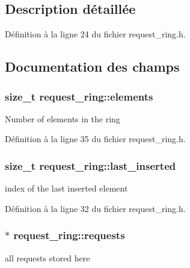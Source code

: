 \subsection{Description détaillée}


Définition à la ligne 24 du fichier request\+\_\+ring.\+h.



\subsection{Documentation des champs}
\hypertarget{structrequest__ring_a32380ec7244da66681fd9c320abf4686}{
\subsubsection[{elements}]{\setlength{\rightskip}{0pt plus 5cm}size\+\_\+t request\+\_\+ring\+::elements}}\label{structrequest__ring_a32380ec7244da66681fd9c320abf4686}
Number of elements in the ring 

Définition à la ligne 35 du fichier request\+\_\+ring.\+h.

\hypertarget{structrequest__ring_adef0d641c116af9f25ecd3ba2afbd901}{
\subsubsection[{last\+\_\+inserted}]{\setlength{\rightskip}{0pt plus 5cm}size\+\_\+t request\+\_\+ring\+::last\+\_\+inserted}}\label{structrequest__ring_adef0d641c116af9f25ecd3ba2afbd901}
index of the last inserted element 

Définition à la ligne 32 du fichier request\+\_\+ring.\+h.

\hypertarget{structrequest__ring_a22a253704723bc76a8620a53049b95e5}{
\subsubsection[{requests}]{$\ast$ request\+\_\+ring\+::requests}}\label{structrequest__ring_a22a253704723bc76a8620a53049b95e5}
all requests stored here 

